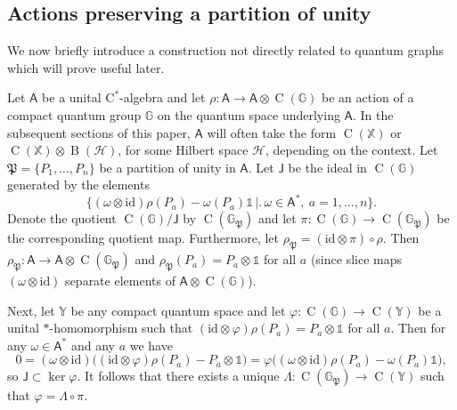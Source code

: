 \documentclass[11pt,reqno]{amsart}
\newcommand{\cst}{\ensuremath{\mathrm{C}^*}}
\newcommand{\id}{\mathrm{id}}
\newcommand{\ph}{\varphi}
\newcommand{\I}{\mathds{1}}
\newcommand{\comp}{\circ}
\newcommand{\tens}{\otimes}
\newcommand{\GG}{\mathbb{G}}
\newcommand{\GP}{\GG_{\scriptscriptstyle{\mathfrak{P}}}}
\newcommand{\rP}{\rho_{\scriptscriptstyle{\mathfrak{P}}}}
\newcommand{\sA}{\mathsf{A}}
\newcommand{\sJ}{\mathsf{J}}
\DeclareMathOperator{\B}{B}
\DeclareMathOperator{\C}{C}
\begin{document}
\subsection{Actions preserving a partition of unity}\label{subsec:action}\hspace*{\fill}

We now briefly introduce a construction not directly related to quantum graphs which will prove useful later. 

Let $\sA$ be a unital \cst-algebra and let $\rho\colon\sA\to\sA\tens\C(\GG)$ be an action of a compact quantum group $\GG$ on the quantum space underlying $\sA$. In the subsequent sections of this paper, $\sA$ will often take the form $\C(\mathbb{X})$ or $\C(\mathbb{X}) \otimes \B(\mathscr{H})$, for some Hilbert space $\mathscr{H}$, depending on the context. Let $\mathfrak{P}=\{P_1,\dotsc,P_n\}$ be a partition of unity in $\sA$. Let $\sJ$ be the ideal in $\C(\GG)$ generated by the elements
\[
\bigl\{(\omega\tens\id)\rho(P_a)-\omega(P_a)\I\,\bigr|\bigl.\,\omega\in\sA^*,\:a=1,\dotsc,n\bigr\}.
\]
Denote the quotient $\C(\GG)/\sJ$ by $\C(\GP)$ and let $\pi\colon\C(\GG)\to\C(\GP)$ be the corresponding quotient map. Furthermore, let $\rP=(\id\tens\pi)\comp\rho$. Then $\rP\colon\sA\to\sA\tens\C(\GP)$ and $\rP(P_a)=P_a\tens\I$ for all $a$ (since slice maps $(\omega\tens\id)$ separate elements of $\sA\tens\C(\GG)$).

Next, let $\mathbb{Y}$ be any compact quantum space and let $\ph\colon\C(\GG)\to\C(\mathbb{Y})$ be a unital $*$-homomorphism such that $(\id\tens\ph)\rho(P_a)=P_a\tens\I$ for all $a$. Then for any $\omega\in\sA^*$ and any $a$ we have
\[
0=(\omega\tens\id)\bigl((\id\tens\ph)\rho(P_a)-P_a\tens\I\bigr)=\ph\bigl((\omega\tens\id)\rho(P_a)-\omega(P_a)\I\bigr),
\]
so $\sJ\subset\ker\ph$. It follows that there exists a unique $\Lambda\colon\C(\GP)\to\C(\mathbb{Y})$ such that $\ph=\Lambda\comp\pi$.
\end{document}
